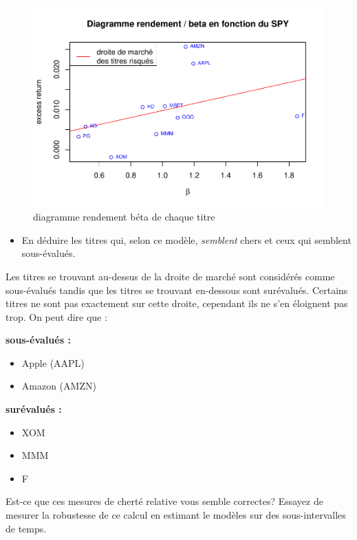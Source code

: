 \documentclass[
]{article}
\providecommand{\tightlist}{%
  \setlength{\itemsep}{0pt}\setlength{\parskip}{0pt}}
\begin{document}
\begin{figure}
\centering
\includegraphics{TP-3_files/figure-latex/fig-1-1.pdf}
\caption{diagramme rendement béta de chaque titre}
\end{figure}

\begin{itemize}
\tightlist
\item
  En déduire les titres qui, selon ce modèle, \emph{semblent} chers et
  ceux qui semblent sous-évalués.
\end{itemize}

Les titres se trouvant au-dessus de la droite de marché sont considérés
comme sous-évalués tandis que les titres se trouvant en-dessous sont
surévalués. Certains titres ne sont pas exactement sur cette droite,
cependant ils ne s'en éloignent pas trop. On peut dire que :

\textbf{sous-évalués :}

\begin{itemize}
\tightlist
\item
  Apple (AAPL)
\item
  Amazon (AMZN)
\end{itemize}

\textbf{surévalués :}

\begin{itemize}
\tightlist
\item
  XOM
\item
  MMM
\item
  F
\end{itemize}

Est-ce que ces mesures de cherté relative vous semble correctes? Essayez
de mesurer la robustesse de ce calcul en estimant le modèles sur des
sous-intervalles de temps.
\end{document}
